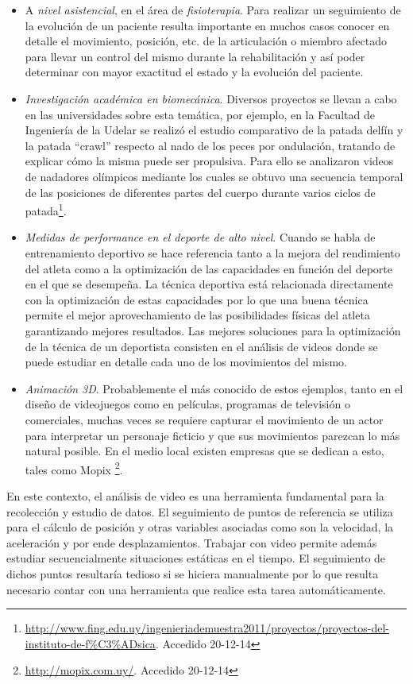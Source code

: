 \begin{itemize}
\item A \emph{nivel asistencial}, en el área de \emph{fisioterapia}. Para realizar un seguimiento de la evolución de un paciente resulta importante en muchos casos conocer en detalle el movimiento, posición, etc. de la articulación o miembro afectado para llevar un control del mismo durante la rehabilitación y así poder determinar con mayor exactitud el estado y la evolución del paciente.
\item \emph{Investigación académica en biomecánica}. Diversos proyectos se llevan a cabo en las universidades sobre esta temática, por ejemplo, en la Facultad de Ingeniería de la Udelar  se realizó el estudio comparativo de la patada delfín y la patada “crawl” respecto al nado de los peces por ondulación, tratando de explicar cómo la misma puede ser propulsiva. Para ello se analizaron videos de nadadores olímpicos mediante los cuales se obtuvo una secuencia temporal de las posiciones de diferentes partes del cuerpo durante varios ciclos de patada\footnote{\textcolor{blue}{\scriptsize{\underline{\url{ http://www.fing.edu.uy/ingenieriademuestra2011/proyectos/proyectos-del-instituto-de-f\%C3\%ADsica}}}}. Accedido 20-12-14}.
\item \emph{Medidas de performance en el deporte de alto nivel}. Cuando se habla de entrenamiento deportivo se hace referencia tanto a la mejora del rendimiento del atleta como a la optimización de las capacidades en función del deporte en el que se desempeña. La técnica deportiva está relacionada directamente con la optimización de estas capacidades por lo que una buena técnica permite el mejor aprovechamiento de las posibilidades físicas del atleta garantizando mejores resultados. Las mejores soluciones para la optimización de la técnica de un deportista consisten en el análisis de videos donde se puede estudiar en detalle cada uno de los movimientos del  mismo.
\item \emph{Animación 3D}. Probablemente el más conocido de estos ejemplos, tanto en el diseño de videojuegos como en películas, programas de televisión o comerciales, muchas veces se requiere capturar el movimiento de un actor para interpretar un personaje ficticio y que sus movimientos parezcan lo más natural posible. En el medio local existen empresas que se dedican a esto, tales como Mopix \footnote{\textcolor{blue}{\underline{\url{http://mopix.com.uy/}}}. Accedido 20-12-14}.
\end{itemize}

En este contexto, el análisis de video  es  una  herramienta  fundamental para la recolección y estudio de datos. El seguimiento de puntos de referencia se utiliza para el cálculo de posición y otras variables asociadas como son la velocidad, la aceleración y por ende desplazamientos. Trabajar con video permite además estudiar secuencialmente situaciones estáticas en el tiempo. El seguimiento de dichos puntos resultaría tedioso si se hiciera manualmente por lo que resulta necesario contar con una herramienta que realice esta tarea automáticamente.
\\ 

